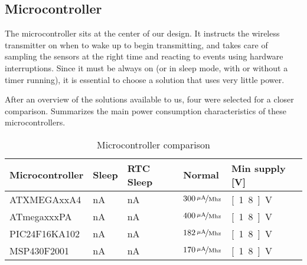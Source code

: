 

\subsection{Microcontroller}
\label{sub:microcontroller}
The microcontroller sits at the center of our design. It instructs the wireless
transmitter on when to wake up to begin transmitting, and takes care of sampling
the sensors at the right time and reacting to events using hardware
interruptions. Since it must be always on (or in sleep mode, with or without a
timer running), it is essential to choose a solution that uses very little
power.

After an overview of the solutions available to us, four were selected for a
closer comparison.  Summarizes the main power
consumption characteristics of these microcontrollers.

\begin{table}
  \centering
  \begin{tabular}{l|l|l|l|l}
    Microcontroller	& Sleep	& RTC Sleep & Normal & Min supply [V]	\\
    \hline
    ATXMEGAxxA4		& \unit[100]{nA} & \unit[600]{nA} &
    			$\unitfrac[300]{\mu{}A}{Mhz}$ & \unit[1.8]{V}	\\
    ATmegaxxxPA		& \unit[100]{nA} & \unit[650]{nA} &
    			$\unitfrac[400]{\mu{}A}{Mhz}$ & \unit[1.8]{V}	\\
    PIC24F16KA102	& \unit[20]{nA} & \unit[510]{nA} &
    			$\unitfrac[182]{\mu{}A}{Mhz}$ & \unit[1.8]{V}	\\
    MSP430F2001		& \unit[50]{nA} & \unit[600]{nA} &
    			$\unitfrac[170]{\mu{}A}{Mhz}$ & \unit[1.8]{V}	\\
  \end{tabular}
  \caption{Microcontroller comparison}
  \label{tab:microcontrollers}
\end{table}

